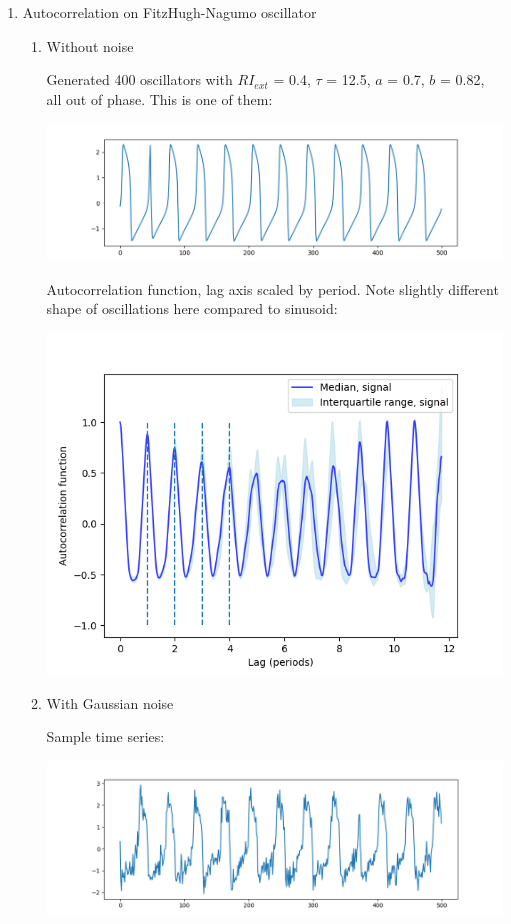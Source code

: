 \begin{enumerate}
\item Autocorrelation on FitzHugh-Nagumo oscillator
\label{sec:org368123f}

\begin{enumerate}
\item Without noise
\label{sec:orgd112f31}

Generated 400 oscillators with \(RI_{ext}\) = 0.4, \(\tau\) = 12.5, \(a\) = 0.7, \(b\) = 0.82, all out of phase.  This is one of them:

\begin{center}
\includegraphics[width=.9\linewidth]{fitzhughnagumo_sample.png}
\end{center}

Autocorrelation function, lag axis scaled by period.  Note slightly different shape of oscillations here compared to sinusoid:

\begin{center}
\includegraphics[width=.9\linewidth]{fitzhughnagumo_acf_scalelag.png}
\end{center}

\item With Gaussian noise
\label{sec:orgaa2bb0c}

Sample time series:
\begin{center}
\includegraphics[width=.9\linewidth]{noisyfitzhughnagumo_sample.png}
\end{center}


\end{enumerate}
\end{enumerate}
